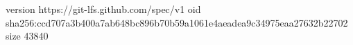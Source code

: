 version https://git-lfs.github.com/spec/v1
oid sha256:ccd707a3b400a7ab648bc896b70b59a1061e4aeadea9c34975eaa27632b22702
size 43840
